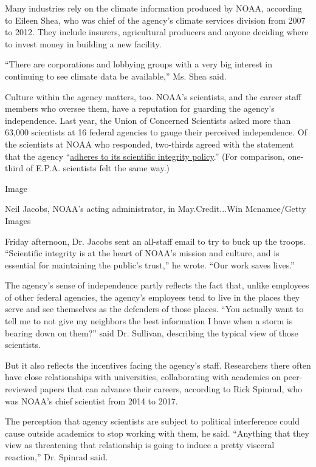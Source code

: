Many industries rely on the climate information produced by NOAA,
according to Eileen Shea, who was chief of the agency's climate services
division from 2007 to 2012. They include insurers, agricultural
producers and anyone deciding where to invest money in building a new
facility.

``There are corporations and lobbying groups with a very big interest in
continuing to see climate data be available,'' Ms. Shea said.

Culture within the agency matters, too. NOAA's scientists, and the
career staff members who oversee them, have a reputation for guarding
the agency's independence. Last year, the Union of Concerned Scientists
asked more than 63,000 scientists at 16 federal agencies to gauge their
perceived independence. Of the scientists at NOAA who responded,
two-thirds agreed with the statement that the agency
``\href{https://www.ucsusa.org/sites/default/files/attach/2018/08/science-under-trump-noaa.pdf}{adheres
to its scientific integrity policy}.'' (For comparison, one-third of
E.P.A. scientists felt the same way.)

Image

Neil Jacobs, NOAA's acting administrator, in May.Credit...Win
Mcnamee/Getty Images

Friday afternoon, Dr. Jacobs sent an all-staff email to try to buck up
the troops. ``Scientific integrity is at the heart of NOAA's mission and
culture, and is essential for maintaining the public's trust,'' he
wrote. ``Our work saves lives.''

The agency's sense of independence partly reflects the fact that, unlike
employees of other federal agencies, the agency's employees tend to live
in the places they serve and see themselves as the defenders of those
places. ``You actually want to tell me to not give my neighbors the best
information I have when a storm is bearing down on them?'' said Dr.
Sullivan, describing the typical view of those scientists.

But it also reflects the incentives facing the agency's staff.
Researchers there often have close relationships with universities,
collaborating with academics on peer-reviewed papers that can advance
their careers, according to Rick Spinrad, who was NOAA's chief scientist
from 2014 to 2017.

The perception that agency scientists are subject to political
interference could cause outside academics to stop working with them, he
said. ``Anything that they view as threatening that relationship is
going to induce a pretty visceral reaction,'' Dr. Spinrad said.

